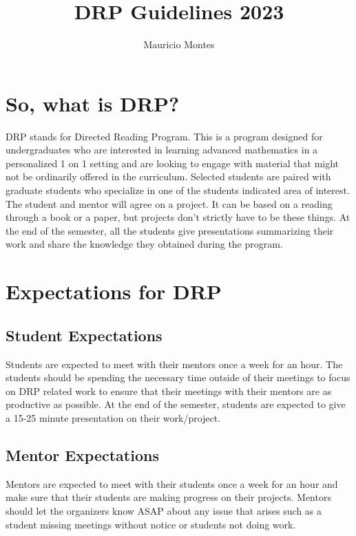 \documentclass{article}
\begin{document}
\author{Mauricio Montes}
\title{DRP Guidelines 2023}

\maketitle

\section{So, what is DRP?}

DRP stands for Directed Reading Program. This is a program designed for undergraduates who are
interested in learning advanced mathematics in a personalized 1 on 1 setting and are looking to
engage with material that might not be ordinarily offered in the curriculum. Selected students are
paired with graduate students who specialize in one of the students indicated area of interest. The
student and mentor will agree on a project. It can be based on a reading through a book or a paper,
but projects don't strictly have to be these things. At the end of the semester, all the students give presentations summarizing their work and share the knowledge they obtained during the program.

\section{Expectations for DRP}

\subsection{Student Expectations}

Students are expected to meet with their mentors once a week for an hour. The students should be
spending the necessary time outside of their meetings to focus on DRP related work to ensure that their
meetings with their mentors are as productive as possible. At the end of the semester, students are
expected to give a 15-25 minute presentation on their work/project. 


\subsection{Mentor Expectations}

Mentors are expected to meet with their students once a week for an hour and make sure that their
students are making progress on their projects. Mentors should let the organizers know ASAP about
any issue that arises such as a student missing meetings without notice or students not doing work.  
\end{document}
